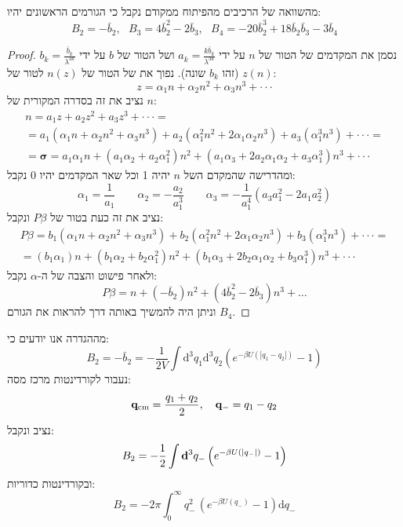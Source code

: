 \documentclass{tstextbook}
\begin{document}
\begin{proposition}
מהשוואה של הרכיבים מהפיתוח ממקודם נקבל כי הגורמים הראשונים יהיו:
$$B_{2}=-\bar{b}_{2},\ \ \ B_{3}=4\bar{b}_{2}^{2}-2\bar{b}_{3},\ \ \ B_{4}=-20\bar{b}_{2}^{3}+18\bar{b}_{2}\bar{b}_{3}-3\bar{b}_{4}$$

\end{proposition}
\begin{proof}
נסמן את המקדמים של הטור של \(n\) על ידי \(a_{k}=\frac{k\bar{b}_{k}}{\lambda^{3k}}\) ושל הטור של \(b\) על ידי \(b_{k}={\frac{\bar{b}_{k}}{\lambda^{3k}}}\)(זהו \(b_{k}\) שונה). נפוך את של הטור של \(n(z)\) לטור של \(z(n)\):
$$z=\alpha_{1}n+\alpha_{2}n^{2}+\alpha_{3}n^{3}+\cdot\cdot\cdot$$
נציב את זה בסדרה המקורית של \(n\):
\begin{gather*}n=a_{1}z+a_{2}z^{2}+a_{3}z^{3}+\cdot\cdot\cdot= \\=a_{1}(\alpha_{1}n+\alpha_{2}n^{2}+\alpha_{3}n^{3})+a_{2}(\alpha_{1}^{2}n^{2}+2\alpha_{1}\alpha_{2}n^{3})+a_{3}(\alpha_{1}^{3}n^{3})+\cdot\cdot\cdot =\\=\mathbf{\sigma}=a_{1}\alpha_{1}n+\left(a_{1}\alpha_{2}+a_{2}\alpha_{1}^{2}\right)n^{2}+\left(a_{1}\alpha_{3}+2a_{2}\alpha_{1}\alpha_{2}+a_{3}\alpha_{1}^{3}\right)n^{3}+\cdot\cdot\cdot
\end{gather*}
ומהדרישה שהמקדם השל \(n\) יהיה 1 וכל שאר המקדמים יהיו 0 נקבל:
$$\alpha_{1}=\frac{1}{a_{1}}\qquad \alpha_{2}=-\frac{a_{2}}{a_{1}^{3}}\qquad \alpha_{3}=-\frac{1}{a_{1}^{4}}(a_{3}a_{1}^{2}-2a_{1}a_{2}^{2})$$
נציב את זה כעת בטור של \(P\beta\) ונקבל:
\begin{gather*}P\beta=b_{1}(\alpha_{1}n+\alpha_{2}n^{2}+\alpha_{3}n^{3})+b_{2}(\alpha_{1}^{2}n^{2}+2\alpha_{1}\alpha_{2}n^{3})+b_{3}(\alpha_{1}^{3}n^{3})+\cdot\cdot\cdot = \\=\left(b_{1}\alpha_{1}\right)n+\left(b_{1}\alpha_{2}+b_{2}\alpha_{1}^{2}\right)n^{2}+\left(b_{1}\alpha_{3}+2b_{2}\alpha_{1}\alpha_{2}+b_{3}\alpha_{1}^{3}\right)n^{3}+\cdot\cdot\cdot
\end{gather*}
ולאחר פישוט והצבה של ה-\(\alpha\) נקבל:
$$P\beta=n+\left( -\bar{b}_{2} \right)n^{2} +\left( 4\bar{b}_{2}^{2}-2\bar{b}_{3} \right)n^{3}+\dots$$
וניתן היה להמשיך באותה דרך להראות את הגורם \(B_{4}\).

\end{proof}
\begin{lemma}
מההגדרה אנו יודעים כי:
$$B_{2}=-\bar{b}_{2}=-\frac{1}{2V}\int\mathrm{d}^{3}q_{1}\mathrm{d}^{3}q_{2}\left(e^{-\beta U\left(|q_{1}-q_{2}|\right)}-1\right)$$
נעבור לקורדינטות מרכז מסה:
$${\bf q}_{\mathrm{cm}}=\frac{q_{1}+q_{2}}{2},\quad{\bf q}_{-}=q_{1}-q_{2}$$
נציב ונקבל:
$$B_{2}=-\frac12\int{\bf d}^{3}q_{-}\left(e^{-\beta U(|q_{-}|)}-1\right)$$
ובקורדינטות כדוריות:
$$B_{2}=-2\pi\int_{0}^{\infty}q_{-}^{2}\,\left(e^{-\beta U(q_{-})}-1\right){\mathrm d}q_{-}$$

\end{lemma}
\end{document}
